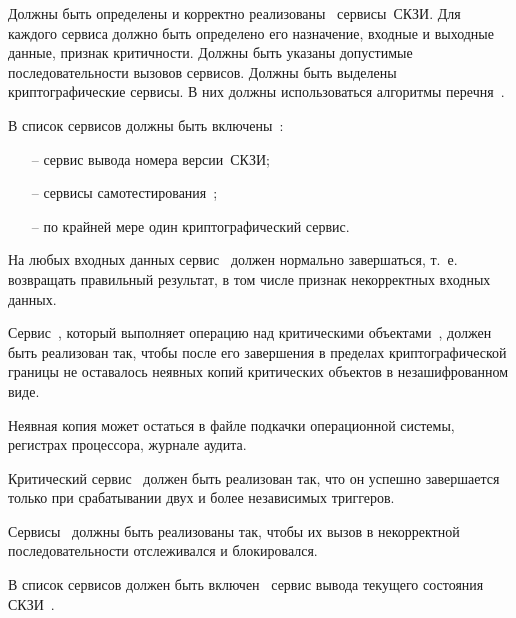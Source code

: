 \label{R.SV.List} %
Должны быть определены и корректно 
реализованы~
сервисы~СКЗИ.
%
Для каждого сервиса должно быть определено его назначение, 
входные и выходные данные, признак критичности.
%
Должны быть указаны допустимые последовательности вызовов сервисов.
%
Должны быть выделены криптографические сервисы.
В них должны использоваться алгоритмы перечня~.

\label{R.SV.Oblig} %
В список сервисов должны быть включены~:
\begin{itemize}
\item[--]
сервис вывода номера версии~СКЗИ;
\item[--]
сервисы самотестирования~;
\item[--]
по крайней мере один криптографический сервис.
\end{itemize}

\label{R.SV.Robust} %
На любых входных данных сервис~ должен нормально 
завершаться, т.~е. возвращать правильный результат,  
в том числе признак некорректных входных данных.

\label{R.SV.Leaks} %
Сервис~, который выполняет операцию над критическими
объектами~, должен быть реализован так, чтобы после его
завершения в пределах криптографической границы не оставалось 
неявных копий критических объектов в незашифрованном виде.

\begin{note*}
Неявная копия может остаться в файле подкачки операционной системы, 
регистрах процессора, журнале аудита. 
\end{note*}

\label{R.SV.Crit} %
Критический сервис~ должен быть реализован так,
что он успешно завершается только при срабатывании двух и более 
независимых триггеров.

\label{R.SV.Seq} %
Сервисы~ должны быть реализованы так, чтобы их вызов в
некорректной последовательности отслеживался и блокировался.

\label{R.SV.Status} %
В список сервисов должен быть включен~
сервис вывода текущего состояния СКЗИ~.

